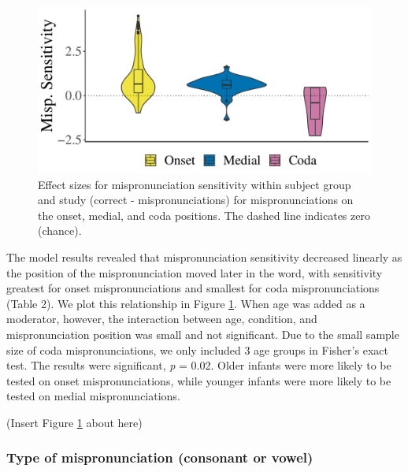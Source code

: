 \documentclass[
  english,
  man, noextraspace]{apa6}
\begin{document}
\begin{figure}
\centering
\includegraphics{VonHolzenBergmann_MPMetaAnalysis_files/figure-latex/PlotMispPosit-1.pdf}
\caption{\label{fig:PlotMispPosit}Effect sizes for mispronunciation sensitivity within subject group and study (correct - mispronunciations) for mispronunciations on the onset, medial, and coda positions. The dashed line indicates zero (chance).}
\end{figure}

The model results revealed that mispronunciation sensitivity decreased linearly as the position of the mispronunciation moved later in the word, with sensitivity greatest for onset mispronunciations and smallest for coda mispronunciations (Table 2). We plot this relationship in Figure \ref{fig:PlotMispPosit}. When age was added as a moderator, however, the interaction between age, condition, and mispronunciation position was small and not significant. Due to the small sample size of coda mispronunciations, we only included 3 age groups in Fisher's exact test. The results were significant, \emph{p} = 0.02. Older infants were more likely to be tested on onset mispronunciations, while younger infants were more likely to be tested on medial mispronunciations.

(Insert Figure \ref{fig:PlotMispPosit} about here)

\hypertarget{type-of-mispronunciation-consonant-or-vowel}{%
\subsubsection{Type of mispronunciation (consonant or vowel)}\label{type-of-mispronunciation-consonant-or-vowel}}
\end{document}
